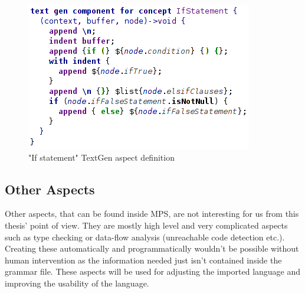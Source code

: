 \begin{figure}[h]
	\centering
	\includegraphics[scale=0.70]{./img/if_statement_textgen.png}
	\caption{"If statement" TextGen aspect definition}
	\label{fig:if_statement_textgen}
\end{figure}

\subsection{Other Aspects}
Other aspects, that can be found inside MPS, are not interesting for us from this thesis' point of view.
They are mostly high level and very complicated aspects such as type checking or data-flow analysis (unreachable code detection etc.).
Creating these automatically and programmatically wouldn't be possible without human intervention as the information needed just isn't contained inside the grammar file.
These aspects will be used for adjusting the imported language and improving the usability of the language.